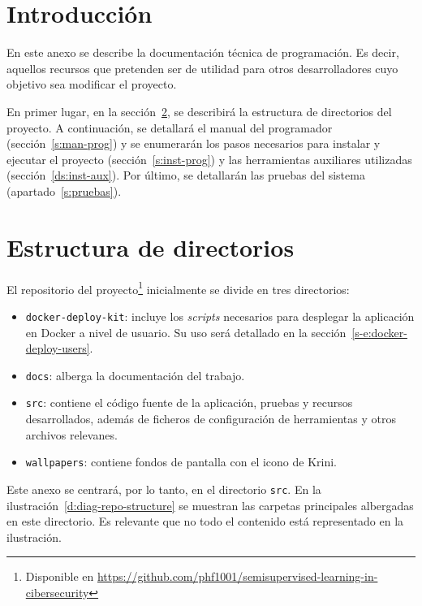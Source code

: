 
\section{Introducción}

En este anexo se describe la documentación técnica de programación. Es decir, aquellos recursos que pretenden ser de utilidad para otros desarrolladores cuyo objetivo sea modificar el proyecto.

En primer lugar, en la sección~\ref{s:estructura-dirs}, se describirá la estructura de directorios del proyecto. A continuación, se detallará el manual del programador (sección~\ref{s:man-prog}) y se enumerarán los pasos necesarios para instalar y ejecutar el proyecto (sección~\ref{s:inst-prog}) y las herramientas auxiliares utilizadas (sección~\ref{ds:inst-aux}). Por último, se detallarán las pruebas del sistema (apartado~\ref{s:pruebas}).

\section{Estructura de directorios}
\label{s:estructura-dirs}

El repositorio del proyecto\footnote{Disponible en \url{https://github.com/phf1001/semisupervised-learning-in-cibersecurity}} inicialmente se divide en tres directorios:

\begin{itemize}
	\item \texttt{docker-deploy-kit}: incluye los \textit{scripts} necesarios para desplegar la aplicación en Docker a nivel de usuario. Su uso será detallado en la sección~\ref{s-e:docker-deploy-users}.
	\item \texttt{docs}: alberga la documentación del trabajo.
	\item \texttt{src}: contiene el código fuente de la aplicación, pruebas y recursos desarrollados, además de ficheros de configuración de herramientas y otros archivos relevanes.
	\item \texttt{wallpapers}: contiene fondos de pantalla con el icono de Krini.
\end{itemize}

Este anexo se centrará, por lo tanto, en el directorio \texttt{src}. En la ilustración~\ref{d:diag-repo-structure} se muestran las carpetas principales albergadas en este directorio. Es relevante que no todo el contenido está representado en la ilustración.

